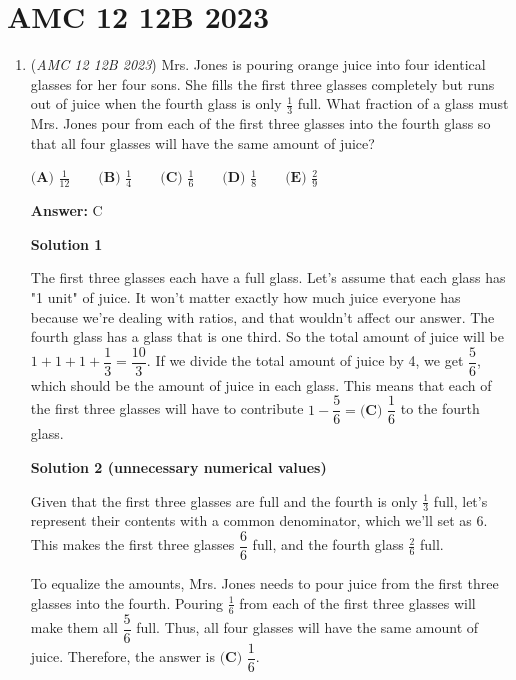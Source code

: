 \section{AMC 12 12B 2023}
        \begin{enumerate}
        	\item (\textit{AMC 12 12B 2023}) Mrs. Jones is pouring orange juice into four identical glasses for her four sons. She fills the first three glasses completely but runs out of juice when the fourth glass is only $\frac{1}{3}$ full. What fraction of a glass must Mrs. Jones pour from each of the first three glasses into the fourth glass so that all four glasses will have the same amount of juice?


 $\textbf{(A) }\frac{1}{12}\qquad\textbf{(B) }\frac{1}{4}\qquad\textbf{(C) }\frac{1}{6}\qquad\textbf{(D) }\frac{1}{8}\qquad\textbf{(E) }\frac{2}{9}$

 \textbf{Answer: }C



\textbf{Solution 1}

The first three glasses each have a full glass.  Let's assume that each glass has "1 unit" of juice. It won't matter exactly how much juice everyone has because we're dealing with ratios, and that wouldn't affect our answer. The fourth glass has a glass that is one third. So the total amount of juice will be $1+1+1+\dfrac{1}{3} = \dfrac{10}{3}$. If we divide the total amount of juice by 4, we get $\dfrac{5}{6}$, which should be the amount of juice in each glass. This means that each of the first three glasses will have to contribute $1 - \dfrac{5}{6} = \boxed{\textbf{(C) }\dfrac16}$ to the fourth glass.

 



\textbf{Solution 2 (unnecessary numerical values)}

Given that the first three glasses are full and the fourth is only $\frac{1}{3}$ full, let's represent their contents with a common denominator, which we'll set as 6. This makes the first three glasses $\dfrac{6}{6}$ full, and the fourth glass $\frac{2}{6}$ full.

 To equalize the amounts, Mrs. Jones needs to pour juice from the first three glasses into the fourth. Pouring $\frac{1}{6}$ from each of the first three glasses will make them all $\dfrac{5}{6}$ full. Thus, all four glasses will have the same amount of juice. Therefore, the answer is $\boxed{\textbf{(C) }\dfrac16}.$





\end{enumerate}
